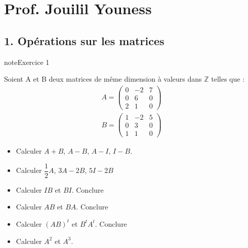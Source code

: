 \documentclass[letterpaper,10pt,french]{jupyterBook}
\begin{document}
\section{Prof. Jouilil Youness}
\label{\detokenize{S_xe9rie3:prof-jouilil-youness}}

\subsection{1. Opérations sur les matrices}
\label{\detokenize{S_xe9rie3:operations-sur-les-matrices}}
\begin{sphinxadmonition}{note}{Exercice 1}

\sphinxAtStartPar
Soient A et B deux matrices de même dimension à valeurs dans \(\mathbb{Z}\) telles que :
\begin{equation*}
\begin{split}
A = 
\begin{pmatrix}
0 & -2 & 7 \\
0 & 6 & 0  \\
2 & 1 & 0 
\end{pmatrix}
\end{split}
\end{equation*}\begin{equation*}
\begin{split}
B = 
\begin{pmatrix}
1 & -2 & 5 \\
0 & 3 & 0  \\
1 & 1 & 0 
\end{pmatrix}
\end{split}
\end{equation*}\begin{itemize}
\item {} 
\sphinxAtStartPar
Calculer \(A + B\), \(A-B\), \(A-I\), \(I-B\).

\item {} 
\sphinxAtStartPar
Calculer \(\dfrac{1}{2} A\), \(3A-2B\), \(5I-2B\)

\item {} 
\sphinxAtStartPar
Calculer \(IB\) et \(BI\). Conclure

\item {} 
\sphinxAtStartPar
Calculer \(AB\) et \(BA\). Conclure

\item {} 
\sphinxAtStartPar
Calculer \((AB)^{t}\) et \(B^tA^t\). Conclure

\item {} 
\sphinxAtStartPar
Calculer \(A^2\) et \(A^3\).

\end{itemize}
\end{sphinxadmonition}
\end{document}
